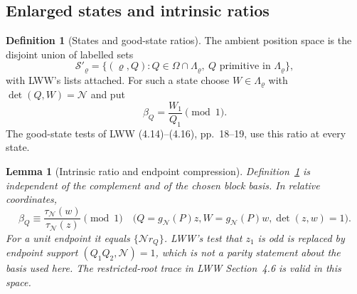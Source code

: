 \documentclass[11pt]{article}
\newtheorem{lemma}[theorem]{Lemma}
\theoremstyle{definition}
\newtheorem{definition}[theorem]{Definition}
\newcommand{\GN}{\mathcal N}
\newcommand{\tauN}{\tau_{\GN}}
\newcommand{\gN}{g_{\GN}}
\theoremstyle{remark}
\numberwithin{equation}{section}
\begin{document}
\subsection{Enlarged states and intrinsic ratios}\label{subsec:enlargement}
\begin{definition}[States and good-state ratios]\label{def:good-ratio}
The ambient position space is the disjoint union of labelled sets
\begin{equation}\label{eq:states}
 \mathcal S'_\varrho=
 \{(\varrho,Q):Q\in\Omega\cap\Lambda_\varrho,
                  \ Q\text{ primitive in }\Lambda_\varrho\},
\end{equation}
with LWW's lists attached. For such a state choose $W\in\Lambda_\varrho$
with $\det(Q,W)=\GN$ and put
\begin{equation}\label{eq:intrinsic-ratio}
 \beta_Q=\frac{W_1}{Q_1}\pmod1.
\end{equation}
The good-state tests of LWW (4.14)--(4.16), pp.~18--19, use this
ratio at every state.
\end{definition}
\begin{lemma}[Intrinsic ratio and endpoint compression]\label{lem:compression}
Definition~\ref{def:good-ratio} is independent of the complement and
of the chosen block basis. In relative coordinates,
\begin{equation}\label{eq:ratio-relative}
 \beta_Q\equiv\frac{\tauN(w)}{\tauN(z)}\pmod1
 \quad\bigl(Q=\gN(P)z, W=\gN(P)w, \det(z,w)=1\bigr).
\end{equation}
For a unit endpoint it equals $\{\GN r_Q\}$.
LWW's test that $z_1$ is odd is replaced by endpoint support
$(Q_1Q_2,\GN)=1$, which is not a parity statement about the basis used here.
The restricted-root trace in LWW Section~4.6 is valid in this space.
\end{lemma}
\end{document}

